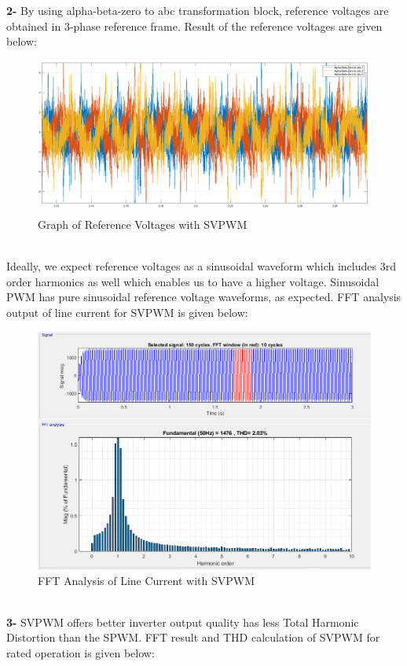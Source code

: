 \documentclass{article}
\begin{document}
\textbf{2-} By using alpha-beta-zero to abc transformation block, reference voltages are obtained in 3-phase reference frame. Result of the reference voltages are given below:
\begin{figure}[H]
    \centering
    \includegraphics[scale=0.2]{reference_svpwm.png}
    \caption{Graph of Reference Voltages with SVPWM}
    \label{fig:my_label}
\end{figure} \\
Ideally, we expect reference voltages as a sinusoidal waveform which includes 3rd order harmonics as well which enables us to have a higher voltage. Sinusoidal PWM has pure sinusoidal reference voltage waveforms, as expected. FFT analysis output of line current for SVPWM is given below: 
\begin{figure}[H]
    \centering
    \includegraphics[scale=0.5]{fft.PNG}
    \caption{FFT Analysis of Line Current with SVPWM}
    \label{fig:my_label}
\end{figure} \\
\textbf{3-} SVPWM offers better inverter output quality has less Total Harmonic Distortion than the SPWM. FFT result and THD calculation of SVPWM for rated operation is given below:
\end{document}
